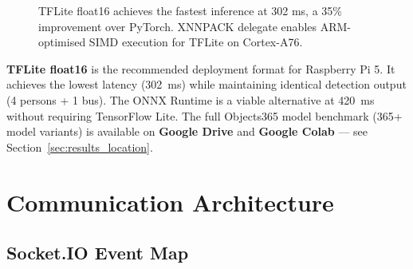 \documentclass[12pt,a4paper]{article}
\begin{document}
\begin{figure}[H]
\centering
{}
\caption{TFLite float16 achieves the fastest inference at 302 ms, a
35\% improvement over PyTorch. XNNPACK delegate enables ARM-optimised SIMD
execution for TFLite on Cortex-A76.}
\label{fig:benchmark_bar}
\end{figure}

\begin{resultbox}
\textbf{TFLite float16} is the recommended deployment format for Raspberry Pi 5.
It achieves the lowest latency (302~ms) while maintaining identical detection
output (4 persons + 1 bus). The ONNX Runtime is a viable alternative at
420~ms without requiring TensorFlow Lite. The full Objects365 model benchmark
(365+ model variants) is available on \textbf{Google Drive} and
\textbf{Google Colab} — see Section~\ref{sec:results_location}.
\end{resultbox}

\section{Communication Architecture}

\subsection{Socket.IO Event Map}
\end{document}
